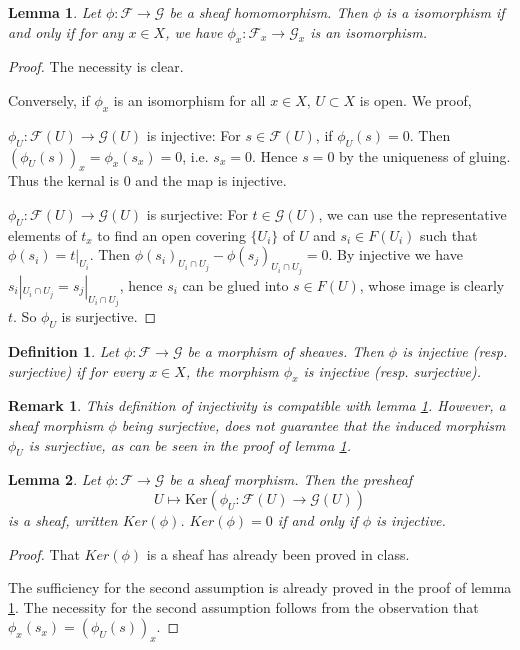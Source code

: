 \documentclass{article}
\numberwithin{equation}{subsection} %
\newtheorem{defi}{Definition}[section]
\newtheorem{lemma}{Lemma}[section]
\newtheorem{remark}{Remark}[section]
\theoremstyle{definition}
\begin{document}
\begin{lemma}
\label{lemma:iso_of_x}
    Let $\phi: \mathcal{F} \to \mathcal{G} $ be a sheaf homomorphism. Then $\phi$ is a isomorphism
    if and only if for any $x\in X$, we have $\phi _x:\mathcal{F}_x\to 
    \mathcal{G}_x$ is an 
    isomorphism.
\end{lemma}
\begin{proof}
    The necessity is clear.

    Conversely, if $\phi_x$ is an isomorphism for all $x\in X$, $U\subset X$ is open. We proof,
    
    $\phi_U: \mathcal{F}(U)\to \mathcal{G}(U)$ is injective: For $s\in \mathcal{F}(U)$, if $\phi_U(s)=0$. Then $\left(\phi _U(s)\right)_x=\phi _x\left(s_x\right)=0$, i.e. $s_x=0$. Hence $s=0$ by the uniqueness of gluing. Thus the kernal is $0$ and the map is injective.

    $\phi_U: \mathcal{F}(U)\to \mathcal{G}(U)$ is surjective: For $t\in \mathcal{G}(U)$, we can use the representative elements of $t_x$ to find an open covering $\{U_i\}$ of $U$ and $s_i\in F(U_i)$ such that $\phi(s_i) = t|_{U_i}$. Then $\phi(s_i)_{U_i\cap U_j}
    - \phi(s_j)_{U_i\cap U_j} = 0$. By injective we have $s_i|_{U_i\cap U_j}
    = s_j|_{U_i\cap U_j}$, hence $s_i$ can be glued into $s\in F(U)$, whose
    image is clearly $t$. So $\phi_U$ is surjective.
\end{proof}

\begin{defi}
	Let $\phi :\mathcal{F}\to \mathcal{G}$ be a morphism of sheaves. Then $\phi$ is injective (resp. surjective) if for every $x\in X$, the morphism $\phi_x$ is injective (resp. surjective).
\end{defi}
\begin{remark}
	This definition of injectivity is compatible with lemma \ref{lemma:iso_of_x}. However, a sheaf morphism $\phi$ being surjective, does not guarantee that the induced morphism $\phi_U$ is surjective, as can be seen in the proof of lemma \ref{lemma:iso_of_x}.
\end{remark}

\begin{lemma}
    Let $\phi :\mathcal{F}\to \mathcal{G}$ be a sheaf morphism. Then the presheaf
    $$U\mapsto \text{Ker}\left(\phi _U:\mathcal{F}(U)\to \mathcal{G}(U)\right)$$
    is a sheaf, written $Ker(\phi)$. $Ker(\phi)=0$ if and only if $\phi$ is injective.
\end{lemma}
\begin{proof}
	That $Ker(\phi)$ is a sheaf has already been proved in class.

	The sufficiency for the second assumption is already proved in the
	proof of lemma \ref{lemma:iso_of_x}. The necessity for the second assumption follows from the observation that $\phi _x\left(s_x\right)=\left(\phi _U(s)\right)_x$.
\end{proof}
\end{document}
